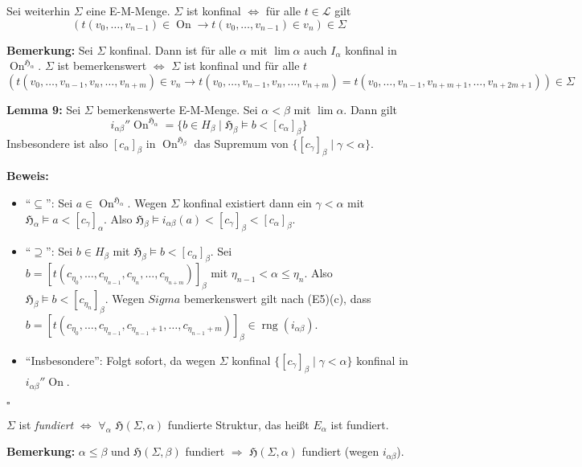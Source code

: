 \documentclass[a4paper,fontsize=11pt]{scrartcl}
\newcommand{\rng}{\operatorname{rng}}
\newcommand{\On}{\operatorname{On}}
\begin{document}
Sei weiterhin $\Sigma$ eine E-M-Menge. $\Sigma$ ist konfinal
$\Leftrightarrow$ für alle $t\in\mathcal{L}$ gilt
$$(t(v_0,\ldots,v_{n-1})\in\On\rightarrow t(v_0,\ldots,v_{n-1})\in
v_n)\in\Sigma$$

{\bf Bemerkung:} Sei $\Sigma$ konfinal. Dann ist für alle $\alpha$ mit
$\lim \alpha$ auch $I_\alpha$ konfinal in $\On^{\mathfrak{H}_\alpha}$.
$\Sigma$ ist bemerkenswert $\Leftrightarrow$ $\Sigma$ ist konfinal und
für alle $t$ $$(t(v_0,\ldots,v_{n-1},v_n,\ldots,v_{n+m})\in v_n
\rightarrow
t(v_0,\ldots,v_{n-1},v_n,\ldots,v_{n+m})=t(v_0,\ldots,v_{n-1},v_{n+m+1},\ldots,v_{n+2m+1}))\in\Sigma$$

{\bf Lemma 9:} Sei $\Sigma$ bemerkenswerte E-M-Menge. Sei $\alpha<\beta$ mit $\lim \alpha$. Dann gilt
$$i_{\alpha\beta}''\On^{\mathfrak{H}_\alpha}=\{b\in
H_\beta\mid\mathfrak{H}_\beta\models b<[c_\alpha]_\beta\}$$ Insbesondere
ist also $[c_\alpha]_\beta$ in $\On^{\mathfrak{H}_\beta}$ das Supremum
von $\{[c_\gamma]_\beta\mid\gamma<\alpha\}$.

{\bf Beweis:}
\begin{itemize}
  \item ``$\subseteq$'': Sei $a\in\On^{\mathfrak{H}_\alpha}$. Wegen
    $\Sigma$ konfinal existiert dann ein $\gamma<\alpha$ mit
    $\mathfrak{H}_\alpha\models a<[c_\gamma]_\alpha$. Also
    $\mathfrak{H}_\beta\models
    i_{\alpha\beta}(a)<[c_\gamma]_\beta<[c_\alpha]_\beta$.
  \item ``$\supseteq$'': Sei $b\in H_\beta$ mit
    $\mathfrak{H}_\beta\models b<[c_\alpha]_\beta$. Sei
    $b=[t(c_{\eta_0},\ldots,c_{\eta_{n-1}},c_{\eta_n},\ldots,c_{\eta_{n+m}})]_\beta$
    mit $\eta_{n-1}<\alpha\le\eta_n$. Also $\mathfrak{H}_\beta\models
    b<[c_{\eta_n}]_\beta$. Wegen $Sigma$ bemerkenswert gilt nach
    (E5)(c), dass
    $b=[t(c_{\eta_0},\ldots,c_{\eta_{n-1}},c_{\eta_{n-1}+1},\ldots,c_{\eta_{n-1}+m})]_\beta\in\rng
    (i_{\alpha\beta})$.
  \item ``Insbesondere'': Folgt sofort, da wegen $\Sigma$ konfinal
    $\{[c_\gamma]_\beta\mid\gamma<\alpha\}$ konfinal in
    $i_{\alpha\beta}''\On$.
\end{itemize}
\hfill $\square$

$\Sigma$ ist {\it fundiert} $\Leftrightarrow$ $\forall_\alpha$
$\mathfrak{H}(\Sigma,\alpha)$ fundierte Struktur, das heißt $E_\alpha$
ist fundiert.

{\bf Bemerkung:} $\alpha\le\beta$ und $\mathfrak{H}(\Sigma,\beta)$
fundiert $\Rightarrow$ $\mathfrak{H}(\Sigma,\alpha)$ fundiert (wegen
$i_{\alpha\beta}$).
\end{document}
